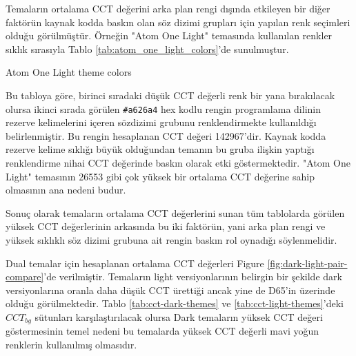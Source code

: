 \documentclass{article}
\begin{document}
Temaların ortalama CCT değerini arka plan rengi dışında etkileyen bir diğer faktörün kaynak kodda baskın olan söz dizimi
grupları için yapılan renk seçimleri olduğu görülmüştür.  Örneğin "Atom One Light" temasında kullanılan renkler sıklık
sırasıyla Tablo \ref{tab:atom_one_light_colors}'de sunulmuştur.


\begin{table}[H]

	\caption{Atom One Light theme colors}
	\label{tab:atom_one_light_colors}
\end{table}

Bu tabloya göre, birinci sıradaki düşük CCT değerli renk bir yana bırakılacak olursa ikinci sırada görülen
\texttt{\#a626a4} hex kodlu rengin programlama dilinin rezerve kelimelerini içeren sözdizimi grubunu renklendirmekte
kullanıldığı belirlenmiştir. Bu rengin hesaplanan CCT değeri 142967'dir.  Kaynak kodda rezerve kelime sıklığı büyük
olduğundan temanın bu gruba ilişkin yaptığı renklendirme nihai CCT değerinde baskın olarak etki göstermektedir. "Atom
One Light" temasının 26553 gibi çok yüksek bir ortalama CCT değerine sahip olmasının ana nedeni budur.

Sonuç olarak temaların ortalama CCT değerlerini sunan tüm tablolarda görülen yüksek CCT değerlerinin arkasında bu iki
faktörün, yani arka plan rengi ve yüksek sıklıklı söz dizimi grubuna ait rengin baskın rol oynadığı söylenmelidir.

Dual temalar için hesaplanan ortalama CCT değerleri Figure \ref{fig:dark-light-pair-compare}'de verilmiştir. Temaların
light versiyonlarının belirgin bir şekilde dark versiyonlarına oranla daha düşük CCT ürettiği ancak yine de D65'in
üzerinde olduğu görülmektedir. Tablo \ref{tab:cct-dark-themes} ve \ref{tab:cct-light-themes}'deki $CCT_{bg}$ sütunları
karşılaştırılacak olursa Dark temaların yüksek CCT değeri göstermesinin temel nedeni bu temalarda yüksek CCT değerli
mavi yoğun renklerin kullanılmış olmasıdır.
\end{document}
